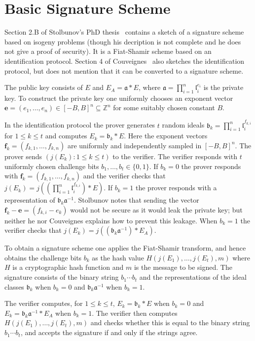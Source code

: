 \documentclass{llncs}
\newcommand{\Z}{\mathbb{Z}}
\renewcommand{\a}{\mathfrak{a}}
\renewcommand{\b}{\mathfrak{b}}
\renewcommand{\l}{\mathfrak{l}}
\newcommand{\e}{\textbf{e}}
\newcommand{\f}{\textbf{f}}
\begin{document}
\section{Basic Signature Scheme}

Section 2.B of Stolbunov's PhD thesis~\cite{Sto12} contains a sketch of a signature scheme based on isogeny problems (though his decription is not complete and he does not give a proof of security).
It is a Fiat-Shamir scheme based on an identification protocol.
Section 4 of Couveignes~\cite{Couv06} also sketches the identification protocol, but does not mention that it can be converted to a signature scheme.


The public key consists of $E$ and $E_A = \a * E$, where $\a = \prod_{i=1}^n \l_i^{e_i}$ is the private key.
To construct the private key one uniformly chooses an exponent vector $\e = (e_1, \dots, e_n) \in [-B,B]^n \subseteq \Z^n$ for some suitably chosen constant $B$.

In the identification protocol the prover generates $t$ random ideals $\b_k = \prod_{i=1}^n \l_i^{f_{k,i}}$ for $1 \le k \le t$ and computes $E_k = \b_k * E$.
Here the exponent vectors $\f_k = ( f_{k,1}, \dots, f_{k,n} )$ are uniformly and independently sampled in $[-B,B]^n$.
The prover sends $(j( E_k ) : 1 \le k \le t )$ to the verifier.
The verifier responds with $t$ uniformly chosen challenge bits $b_1, \dots, b_t \in \{0,1\}$.
If $b_k = 0$ the prover responds with $\f_k = ( f_{k,1}, \dots, f_{k,n} )$ and the verifier checks that $j(E_k) = j( (\prod_{i=1}^n \l_i^{f_{k,i}}) * E )$.
If $b_k = 1$ the prover responds with a representation of $\b_k \a^{-1}$. Stolbunov notes that sending the vector $\f_k - \e = (f_{k,i} - e_k )$ would not be secure as it would leak the private key; but neither he nor Couveignes explains how to prevent this leakage.
When $b_k=1$ the verifier checks that $j(E_k) = j( (\b_k \a^{-1}) * E_A )$.

To obtain a signature scheme one applies the Fiat-Shamir transform, and hence obtains the challenge bits $b_k$ as the hash value $H( j(E_1), \dots, j(E_t) , m )$ where $H$ is a cryptographic hash function and $m$ is the message to be signed.
The signature consists of the binary string $b_1\cdots b_t$ and the representations of the ideal classes $\b_k$ when $b_k = 0$ and $\b_k \a^{-1}$ when $b_k = 1$.

The verifier computes, for $1 \le k \le t$, $E_k = \b_k * E$ when $b_k = 0$ and $E_k = \b_k \a^{-1} * E_A$ when $b_k = 1$. The verifier then computes $H( j( E_1), \dots, j(E_t), m )$ and checks whether this is equal to the binary string $b_1\cdots b_t$, and accepts the signature if and only if the strings agree.
\end{document}
